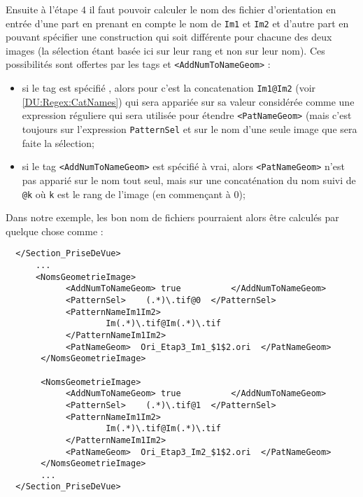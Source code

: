 Ensuite \`a l'\'etape $4$ il faut pouvoir calculer le nom
des fichier d'orientation en entr\'ee d'une part en prenant en compte 
le nom de {\tt Im1} et {\tt Im2} et d'autre part en pouvant sp\'ecifier
une construction qui soit diff\'erente pour chacune des deux images (la
s\'election \'etant bas\'ee ici sur leur rang et non sur leur nom).
Ces possibilit\'es sont  offertes par  les tags {\tt <PatternNameIm1Im2>}
et {\tt <AddNumToNameGeom>} :

\begin{itemize}
   \item  si le tag {\tt <PatternNameIm1Im2>} est sp\'ecifi\'e , alors
          pour c'est la concatenation {\tt Im1@Im2}  (voir~ \ref{DU:Regex:CatNames})
          qui sera appari\'ee
          sur sa valeur consid\'er\'ee comme une expression r\'eguliere
          qui sera utilis\'ee pour \'etendre {\tt <PatNameGeom>} (mais
          c'est toujours sur l'expression {\tt PatternSel} et sur le nom
          d'une seule image que sera faite la s\'election;

   \item  si le tag {\tt <AddNumToNameGeom>} est  sp\'ecifi\'e \`a vrai,
          alors {\tt <PatNameGeom>} n'est pas appari\'e sur le nom
          tout seul, mais sur une concat\'enation du nom suivi de {\tt @k}
          o\`u {\tt k} est le rang de l'image (en commen\c{c}ant \`a $0$);
\end{itemize}

Dans notre exemple, les bon nom de fichiers pourraient alors
\^etre calcul\'es par quelque chose comme :

\begin{verbatim}
  </Section_PriseDeVue>
      ...
      <NomsGeometrieImage>
            <AddNumToNameGeom> true          </AddNumToNameGeom>
            <PatternSel>    (.*)\.tif@0  </PatternSel>
            <PatternNameIm1Im2>
                    Im(.*)\.tif@Im(.*)\.tif
            </PatternNameIm1Im2>
            <PatNameGeom>  Ori_Etap3_Im1_$1$2.ori  </PatNameGeom>
       </NomsGeometrieImage>

       <NomsGeometrieImage>
            <AddNumToNameGeom> true          </AddNumToNameGeom>
            <PatternSel>    (.*)\.tif@1  </PatternSel>
            <PatternNameIm1Im2>
                    Im(.*)\.tif@Im(.*)\.tif
            </PatternNameIm1Im2>
            <PatNameGeom>  Ori_Etap3_Im2_$1$2.ori  </PatNameGeom>
       </NomsGeometrieImage>
       ...
  </Section_PriseDeVue>
\end{verbatim}

